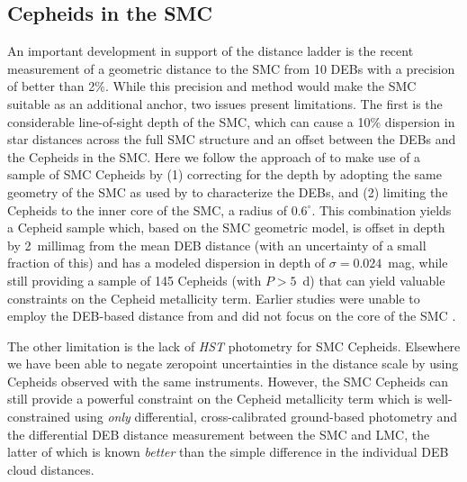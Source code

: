 \documentclass[12pt]{aastex631}
\begin{document}
\subsection{Cepheids in the SMC\label{sc:4.3}}
   
An important development in support of the distance ladder is the recent measurement of a geometric distance to the SMC from 10 DEBs \citep{Graczyk:2020} with a precision of better than 2\%.  While this precision and method would make the SMC suitable as an additional anchor, two issues present limitations.  The first is the considerable line-of-sight depth of the SMC, which can cause a 10\% dispersion in star distances across the full SMC structure and an offset between the DEBs and the Cepheids in the SMC.  Here we follow the approach of \citet{Breuval:2021} to make use of a sample of SMC Cepheids by (1) correcting for the depth by adopting the same geometry of the SMC as used by \citet{Graczyk:2020} to characterize the DEBs, and (2) limiting the Cepheids to the inner core of the SMC, a radius of $0.6^\circ$. This combination yields a Cepheid sample which, based on the SMC geometric model, is offset in depth by 2~millimag from the mean DEB distance (with an uncertainty of a small fraction of this) and has a modeled dispersion in depth of $\sigma=0.024$~mag, while still providing a sample of 145 Cepheids (with $P>5$~d) that can yield valuable constraints on the Cepheid metallicity term. Earlier studies \citep{Gieren:2018} were unable to employ the DEB-based distance from \citet{Graczyk:2020} and did not focus on the core of the SMC \citep{Wielgorski:2017}.  

The other limitation is the lack of {\it HST} photometry for SMC Cepheids.  Elsewhere we have been able to negate zeropoint uncertainties in the distance scale by using Cepheids observed with the same instruments. However, the SMC Cepheids can still provide a powerful constraint on the Cepheid metallicity term which is well-constrained using {\it only} differential, cross-calibrated ground-based photometry and the differential DEB distance measurement between the SMC and LMC, the latter of which is known {\it better} than the simple difference in the individual DEB cloud distances.
   
\end{document}
